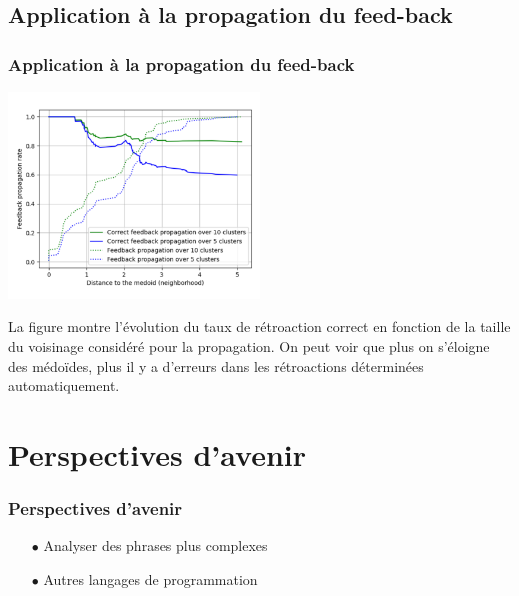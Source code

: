 \documentclass[xcolor=dvipsnames]{beamer}
\begin{document}
\subsection{Application à la propagation du feed-back}
\begin{frame}[fragile]
\begin{center}
\frametitle{Application à la propagation du feed-back}
\includegraphics[width= 0.5\textwidth]{images/Figure_7.png}
\vspace{-0.5cm}
\end{center}
La figure montre l'évolution du taux de rétroaction correct en fonction de la taille du voisinage considéré pour la propagation. On peut voir que plus on s'éloigne des médoïdes, plus il y a d'erreurs dans les rétroactions déterminées automatiquement.
\end{frame}


\section{Perspectives d'avenir}
\begin{frame}[fragile]
\frametitle{Perspectives d'avenir}
\begin{itemize}
\item[$\bullet$] Analyser des phrases plus complexes

\item[$\bullet$] Autres langages de programmation
\end{itemize}

\end{frame}
\end{document}
